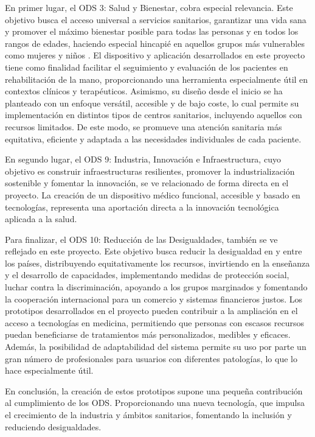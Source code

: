 En primer lugar, el ODS 3: Salud y Bienestar, cobra especial relevancia. Este objetivo busca el acceso universal a servicios sanitarios, garantizar una vida sana y promover el máximo bienestar posible para todas las personas y en todos los rangos de edades, haciendo especial hincapié en aquellos grupos más vulnerables como mujeres y niños . El dispositivo y aplicación desarrollados en este proyecto tiene como finalidad facilitar el seguimiento y evaluación de los pacientes en rehabilitación de la mano, proporcionando una herramienta especialmente útil en contextos clínicos y terapéuticos. Asimismo, su diseño desde el inicio se ha planteado con un enfoque versátil, accesible y de bajo coste, lo cual permite su implementación en distintos tipos de centros sanitarios, incluyendo aquellos con recursos limitados. De este modo, se promueve una atención sanitaria más equitativa, eficiente y adaptada a las necesidades individuales de cada paciente. \cite{salud_ODS}

En segundo lugar, el ODS 9: Industria, Innovación e Infraestructura, cuyo objetivo es construir infraestructuras resilientes, promover la industrialización sostenible y fomentar la innovación, se ve relacionado de forma directa en el proyecto. La creación de un dispositivo médico funcional, accesible y basado en tecnologías, representa una aportación directa a la innovación tecnológica aplicada a la salud. \cite{infraestructura_ODS}

Para finalizar, el ODS 10: Reducción de las Desigualdades, también se ve reflejado en este proyecto. Este objetivo busca reducir la desigualdad en y entre los países, distribuyendo equitativamente los recursos, invirtiendo en la enseñanza y el desarrollo de capacidades, implementando medidas de protección social, luchar contra la discriminación, apoyando a los grupos marginados y fomentando la cooperación internacional para un comercio y sistemas financieros justos. Los prototipos desarrollados en el proyecto pueden contribuir a la ampliación en el acceso a tecnologías en medicina, permitiendo que personas con escasos recursos puedan beneficiarse de tratamientos más personalizados, medibles y eficaces. Además, la posibilidad de adaptabilidad del sistema permite su uso por parte un gran número de profesionales para usuarios con diferentes patologías, lo que lo hace especialmente útil. \cite{desigualdades_ODS}

En conclusión, la creación de estos prototipos supone una pequeña contribución al cumplimiento de los ODS. Proporcionando una nueva tecnología, que impulsa el crecimiento de la industria y ámbitos sanitarios, fomentando la inclusión y reduciendo desigualdades.